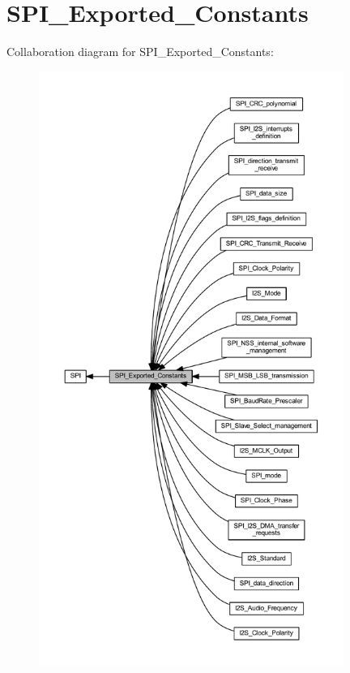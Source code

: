 \hypertarget{group___s_p_i___exported___constants}{}\section{S\+P\+I\+\_\+\+Exported\+\_\+\+Constants}
\label{group___s_p_i___exported___constants}
Collaboration diagram for S\+P\+I\+\_\+\+Exported\+\_\+\+Constants\+:
\nopagebreak
\begin{figure}[H]
\begin{center}
\leavevmode
\includegraphics[height=550pt]{group___s_p_i___exported___constants}
\end{center}
\end{figure}
